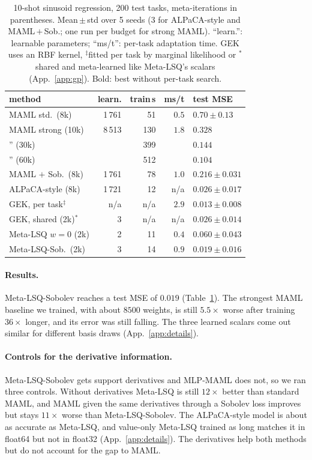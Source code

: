 \documentclass[fullpaper,final]{nldl}
\theoremstyle{plain}
\theoremstyle{definition}
\begin{document}
\begin{table}[tb]
\centering
\caption{10-shot sinusoid regression, 200 test tasks, meta-iterations in
parentheses. Mean\,$\pm$\,std over 5 seeds (3 for ALPaCA-style and MAML\,$+$\,Sob.;
one run per budget for strong MAML). ``learn.'': learnable parameters; ``ms/t'':
per-task adaptation time. GEK uses an RBF kernel, $^\ddagger$fitted per task by
marginal likelihood or $^\ast$shared and meta-learned like Meta-LSQ's scalars
(App.~\ref{app:gp}). Bold: best without per-task search.}
\label{tab:maml}
\footnotesize
\setlength{\tabcolsep}{2pt}
\begin{tabular}{lrrrl}
\toprule
method & learn. & train\,s & ms/t & test MSE \\
\midrule
MAML std.\ (8k)       & 1\,761 & 51  & $0.5$ & $0.70 \pm 0.13$ \\
MAML strong (10k)     & 8\,513 & 130 & $1.8$ & $0.328$ \\
\quad'' (30k)         &        & 399 &        & $0.144$ \\
\quad'' (60k)         &        & 512 &        & $0.104$ \\
MAML $+$ Sob.\ (8k)   & 1\,761 & 78  & $1.0$ & $0.216 \pm 0.031$ \\
ALPaCA-style (8k)     & 1\,721 & 12  & n/a   & $0.026 \pm 0.017$ \\
GEK, per task$^\ddagger$ & n/a & n/a & $2.9$ & $0.013 \pm 0.008$ \\
GEK, shared (2k)$^\ast$ & 3 & n/a & n/a & $0.026 \pm 0.014$ \\
\midrule
Meta-LSQ $w{=}0$ (2k) & 2      & 11  & $0.4$ & $0.060 \pm 0.043$ \\
Meta-LSQ-Sob.\ (2k)   & 3      & 14  & $0.9$ & $\mathbf{0.019 \pm 0.016}$ \\
\bottomrule
\end{tabular}
\end{table}

\paragraph{Results.}
Meta-LSQ-Sobolev reaches a test MSE of $0.019$ (Table~\ref{tab:maml}). The strongest
MAML baseline we trained, with about $8500$ weights, is still $5.5\times$ worse after
training $36\times$ longer, and its error was still falling. The three learned
scalars come out similar for different basis draws (App.~\ref{app:details}).

\paragraph{Controls for the derivative information.}
Meta-LSQ-Sobolev gets support derivatives and MLP-MAML does not, so we ran three
controls. Without derivatives Meta-LSQ is still
$12\times$ better than standard MAML, and MAML given the same derivatives through a
Sobolev loss improves but stays $11\times$ worse than Meta-LSQ-Sobolev. The
ALPaCA-style model is about as accurate as Meta-LSQ, and value-only Meta-LSQ trained as long matches it
in float64 but not in float32 (App.~\ref{app:details}). The derivatives help both methods but do not account for
the gap to MAML.
\end{document}

